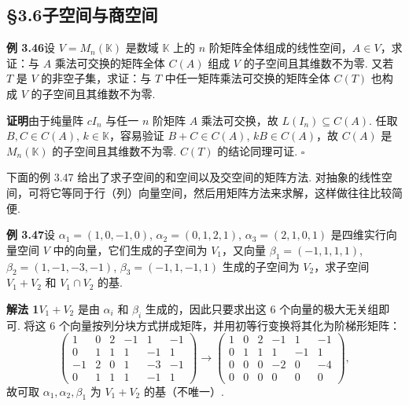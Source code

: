 \documentclass[UTF8, 12pt, fontset=fandol, oneside]{ctexart}
\begin{document}
\subsection*{§3.6\quad 子空间与商空间}

\noindent\textbf{例 3.46}\quad 设 $V=M_n(\mathbb{K})$ 是数域 $\mathbb{K}$ 上的 $n$ 阶矩阵全体组成的线性空间，$A\in V$，求证：与 $A$ 乘法可交换的矩阵全体 $C(A)$ 组成 $V$ 的子空间且其维数不为零. 又若 $T$ 是 $V$ 的非空子集，求证：与 $T$ 中任一矩阵乘法可交换的矩阵全体 $C(T)$ 也构成 $V$ 的子空间且其维数不为零.

\noindent\textbf{证明}\quad 由于纯量阵 $cI_n$ 与任一 $n$ 阶矩阵 $A$ 乘法可交换，故 $L(I_n)\subseteq C(A)$. 任取 $B,C\in C(A)$, $k\in\mathbb{K}$，容易验证 $B+C\in C(A)$, $kB\in C(A)$，故 $C(A)$ 是 $M_n(\mathbb{K})$ 的子空间且其维数不为零. $C(T)$ 的结论同理可证. $\square$

下面的例 3.47 给出了求子空间的和空间以及交空间的矩阵方法. 对抽象的线性空间，可将它等同于行（列）向量空间，然后用矩阵方法来求解，这样做往往比较简便.

\noindent\textbf{例 3.47}\quad 设 $\alpha_1=(1,0,-1,0)$, $\alpha_2=(0,1,2,1)$, $\alpha_3=(2,1,0,1)$ 是四维实行向量空间 $V$ 中的向量，它们生成的子空间为 $V_1$，又向量 $\beta_1=(-1,1,1,1)$, $\beta_2=(1,-1,-3,-1)$, $\beta_3=(-1,1,-1,1)$ 生成的子空间为 $V_2$，求子空间 $V_1+V_2$ 和 $V_1\cap V_2$ 的基.

\noindent\textbf{解法 1}\quad $V_1+V_2$ 是由 $\alpha_i$ 和 $\beta_i$ 生成的，因此只要求出这 6 个向量的极大无关组即可. 将这 6 个向量按列分块方式拼成矩阵，并用初等行变换将其化为阶梯形矩阵：
\[
\begin{pmatrix}
1&0&2&-1&1&-1\\
0&1&1&1&-1&1\\
-1&2&0&1&-3&-1\\
0&1&1&1&-1&1
\end{pmatrix}
\to
\begin{pmatrix}
1&0&2&-1&1&-1\\
0&1&1&1&-1&1\\
0&0&0&-2&0&-4\\
0&0&0&0&0&0
\end{pmatrix},
\]
故可取 $\alpha_1,\alpha_2,\beta_1$ 为 $V_1+V_2$ 的基（不唯一）.
\end{document}
